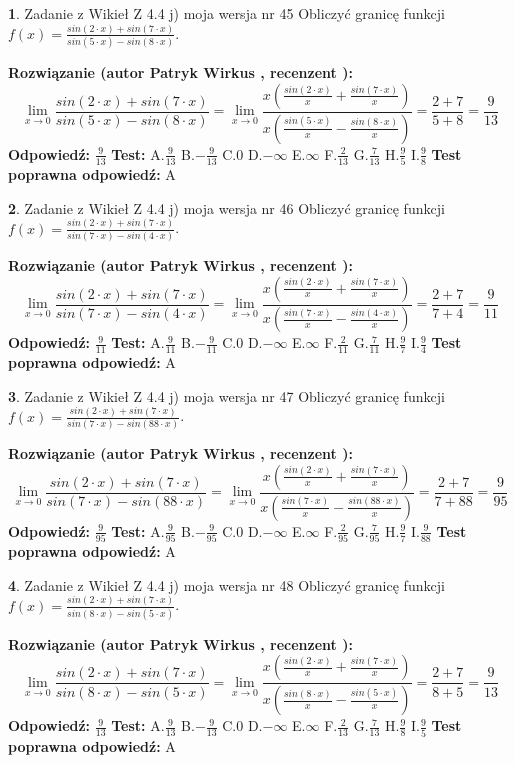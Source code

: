 \documentclass[12pt, a4paper]{article}
\theoremstyle{definition} %
\newtheorem{zad}{}
\newcommand{\zadStart}[1]{\begin{zad}#1\newline}
\newcommand{\zadStop}{\end{zad}}
\newcommand{\rozwStart}[2]{\noindent \textbf{Rozwiązanie (autor #1 , recenzent #2): }\newline}
\newcommand{\rozwStop}{\newline}
\newcommand{\odpStart}{\noindent \textbf{Odpowiedź:}\newline}
\newcommand{\odpStop}{\newline}
\newcommand{\testStart}{\noindent \textbf{Test:}\newline}
\newcommand{\testStop}{\newline}
\newcommand{\kluczStart}{\noindent \textbf{Test poprawna odpowiedź:}\newline}
\newcommand{\kluczStop}{\newline}
\begin{document}
\zadStart{Zadanie z Wikieł Z 4.4 j) moja wersja nr 45}
Obliczyć granicę funkcji $f(x)=\frac{sin(2\cdot x) +sin(7\cdot x)}{sin(5\cdot x) -sin(8\cdot x)}$.
\zadStop
\rozwStart{Patryk Wirkus}{}
$$\lim\limits_{x\to 0}\frac{sin(2\cdot x) +sin(7\cdot x)}{sin(5\cdot x) -sin(8\cdot x)}=\lim\limits_{x\to 0}\frac{x(\frac{sin(2\cdot x)}{x}+\frac{sin(7\cdot x)}{x})}{x(\frac{sin(5\cdot x)}{x}-\frac{sin(8\cdot x)}{x})}=\frac{2+7}{5+8} = \frac{9}{13}$$
\rozwStop
\odpStart
$\frac{9}{13}$
\odpStop
\testStart
A.$\frac{9}{13}$
B.$-\frac{9}{13}$
C.$0$
D.$-\infty$
E.$\infty$
F.$\frac{2}{13}$
G.$\frac{7}{13}$
H.$\frac{9}{5}$
I.$\frac{9}{8}$
\testStop
\kluczStart
A
\kluczStop



\zadStart{Zadanie z Wikieł Z 4.4 j) moja wersja nr 46}
Obliczyć granicę funkcji $f(x)=\frac{sin(2\cdot x) +sin(7\cdot x)}{sin(7\cdot x) -sin(4\cdot x)}$.
\zadStop
\rozwStart{Patryk Wirkus}{}
$$\lim\limits_{x\to 0}\frac{sin(2\cdot x) +sin(7\cdot x)}{sin(7\cdot x) -sin(4\cdot x)}=\lim\limits_{x\to 0}\frac{x(\frac{sin(2\cdot x)}{x}+\frac{sin(7\cdot x)}{x})}{x(\frac{sin(7\cdot x)}{x}-\frac{sin(4\cdot x)}{x})}=\frac{2+7}{7+4} = \frac{9}{11}$$
\rozwStop
\odpStart
$\frac{9}{11}$
\odpStop
\testStart
A.$\frac{9}{11}$
B.$-\frac{9}{11}$
C.$0$
D.$-\infty$
E.$\infty$
F.$\frac{2}{11}$
G.$\frac{7}{11}$
H.$\frac{9}{7}$
I.$\frac{9}{4}$
\testStop
\kluczStart
A
\kluczStop



\zadStart{Zadanie z Wikieł Z 4.4 j) moja wersja nr 47}
Obliczyć granicę funkcji $f(x)=\frac{sin(2\cdot x) +sin(7\cdot x)}{sin(7\cdot x) -sin(88\cdot x)}$.
\zadStop
\rozwStart{Patryk Wirkus}{}
$$\lim\limits_{x\to 0}\frac{sin(2\cdot x) +sin(7\cdot x)}{sin(7\cdot x) -sin(88\cdot x)}=\lim\limits_{x\to 0}\frac{x(\frac{sin(2\cdot x)}{x}+\frac{sin(7\cdot x)}{x})}{x(\frac{sin(7\cdot x)}{x}-\frac{sin(88\cdot x)}{x})}=\frac{2+7}{7+88} = \frac{9}{95}$$
\rozwStop
\odpStart
$\frac{9}{95}$
\odpStop
\testStart
A.$\frac{9}{95}$
B.$-\frac{9}{95}$
C.$0$
D.$-\infty$
E.$\infty$
F.$\frac{2}{95}$
G.$\frac{7}{95}$
H.$\frac{9}{7}$
I.$\frac{9}{88}$
\testStop
\kluczStart
A
\kluczStop



\zadStart{Zadanie z Wikieł Z 4.4 j) moja wersja nr 48}
Obliczyć granicę funkcji $f(x)=\frac{sin(2\cdot x) +sin(7\cdot x)}{sin(8\cdot x) -sin(5\cdot x)}$.
\zadStop
\rozwStart{Patryk Wirkus}{}
$$\lim\limits_{x\to 0}\frac{sin(2\cdot x) +sin(7\cdot x)}{sin(8\cdot x) -sin(5\cdot x)}=\lim\limits_{x\to 0}\frac{x(\frac{sin(2\cdot x)}{x}+\frac{sin(7\cdot x)}{x})}{x(\frac{sin(8\cdot x)}{x}-\frac{sin(5\cdot x)}{x})}=\frac{2+7}{8+5} = \frac{9}{13}$$
\rozwStop
\odpStart
$\frac{9}{13}$
\odpStop
\testStart
A.$\frac{9}{13}$
B.$-\frac{9}{13}$
C.$0$
D.$-\infty$
E.$\infty$
F.$\frac{2}{13}$
G.$\frac{7}{13}$
H.$\frac{9}{8}$
I.$\frac{9}{5}$
\testStop
\kluczStart
A
\kluczStop
\end{document}
